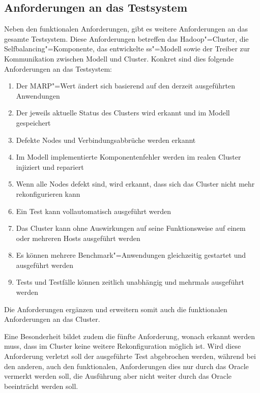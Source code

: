 \subsection{Anforderungen an das Testsystem}
\label{subsec:testRequirements}

Neben den funktionalen Anforderungen, gibt es weitere Anforderungen an das gesamte Testsystem.
Diese Anforderungen betreffen das Hadoop"=Cluster, die Selfbalancing"=Komponente, das entwickelte \ac{ss}"=Modell sowie der Treiber zur Kommunikation zwischen Modell und Cluster.
Konkret sind dies folgende Anforderungen an das Testsystem:

\begin{enumerate}
    \item Der \ac{MARP}"=Wert ändert sich basierend auf den derzeit ausgeführten Anwendungen
    \item Der jeweils aktuelle Status des Clusters wird erkannt und im Modell gespeichert
    \item Defekte Nodes und Verbindungsabbrüche werden erkannt
    \item Im Modell implementierte Komponentenfehler werden im realen Cluster injiziert und repariert
    \item Wenn alle Nodes defekt sind, wird erkannt, dass sich das Cluster nicht mehr rekonfigurieren kann
    \item Ein Test kann vollautomatisch ausgeführt werden
    \item Das Cluster kann ohne Auswirkungen auf seine Funktionsweise auf einem oder mehreren Hosts ausgeführt werden
    \item Es können mehrere Benchmark"=Anwendungen gleichzeitig gestartet und ausgeführt werden
    \item Tests und Testfälle können zeitlich unabhängig und mehrmals ausgeführt werden
\end{enumerate}

Die Anforderungen ergänzen und erweitern somit auch die funktionalen Anforderungen an das Cluster.

Eine Besonderheit bildet zudem die fünfte Anforderung, wonach erkannt werden muss, dass im Cluster keine weitere Rekonfiguration möglich ist.
Wird diese Anforderung verletzt soll der ausgeführte Test abgebrochen werden, während bei den anderen, auch den funktionalen, Anforderungen dies nur durch das Oracle vermerkt werden soll, die Ausführung aber nicht weiter durch das Oracle beeinträcht werden soll.
